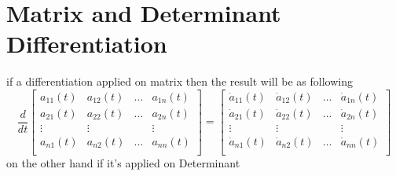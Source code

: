 \documentclass[]{article}
\begin{document}
\section{Matrix and Determinant Differentiation}
if a differentiation applied on matrix then the result will be as following
\[
    \frac{d}{dt} \begin{bmatrix}
        a_{11}(t) & a_{12}(t) & \dots & a_{1n}(t) \\
        a_{21}(t) & a_{22}(t) & \dots & a_{2n}(t) \\
        \vdots    & \vdots    &       & \vdots    \\
        a_{n1}(t) & a_{n2}(t) & \dots & a_{nn}(t) \\
    \end{bmatrix}
    =
    \begin{bmatrix}
        \dot{a}_{11}(t) & \dot{a}_{12}(t) & \dots & \dot{a}_{1n}(t) \\
        \dot{a}_{21}(t) & \dot{a}_{22}(t) & \dots & \dot{a}_{2n}(t) \\
        \vdots          & \vdots          &       & \vdots          \\
        \dot{a}_{n1}(t) & \dot{a}_{n2}(t) & \dots & \dot{a}_{nn}(t) \\
    \end{bmatrix}
\]
on the other hand if it's applied on Determinant
\end{document}
